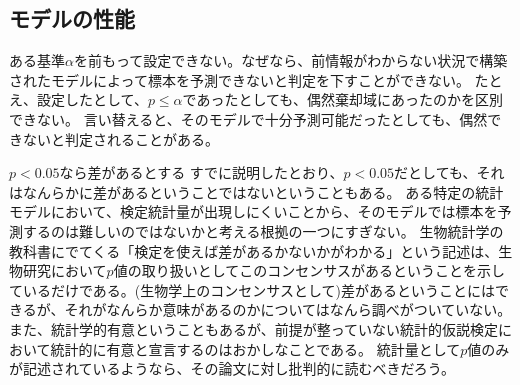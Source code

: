 \subsection{モデルの性能}
ある基準$\alpha$を前もって設定できない。なぜなら、前情報がわからない状況で構築されたモデルによって標本を予測できないと判定を下すことができない。
たとえ、設定したとして、$p \leq \alpha$であったとしても、偶然棄却域にあったのかを区別できない。
言い替えると、そのモデルで十分予測可能だったとしても、偶然できないと判定されることがある。




\begin{SMbox}{$p<0.05$なら差があるとする}
 すでに説明したとおり、$p<0.05$だとしても、それはなんらかに差があるということではないということもある。 ある特定の統計モデルにおいて、検定統計量が出現しにくいことから、そのモデルでは標本を予測するのは難しいのではないかと考える根拠の一つにすぎない。 生物統計学の教科書にでてくる「検定を使えば差があるかないかがわかる」という記述は、生物研究において$p$値の取り扱いとしてこのコンセンサスがあるということを示しているだけである。(生物学上のコンセンサスとして)差があるということにはできるが、それがなんらか意味があるのかについてはなんら調べがついていない。また、統計学的有意ということもあるが、前提が整っていない統計的仮説検定において統計的に有意と宣言するのはおかしなことである。
 統計量として$p$値のみが記述されているようなら、その論文に対し批判的に読むべきだろう。
\end{SMbox}

